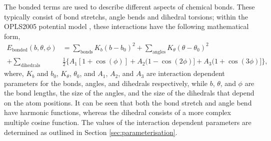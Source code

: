 The bonded terms are used to describe different aspects of chemical bonds.
These typically consist of bond stretchs, angle bends and dihedral torsions; within the OPLS2005 potential model \cite{Banks2005}, these interactions have the following mathematical form,
%
\begin{equation}
\begin{aligned}
  E_{\text{bonded}}(b, \theta, \phi) & = \sum_{\text{bonds}}K_b(b-b_0)^2 + \sum_{\text{angles}}K_{\theta}(\theta-\theta_0)^2 \\
  + \sum_{\text{dihedrals}} & \frac{1}{2}\big\{A_1[1 + \cos(\phi)] + A_2(1 - \cos(2\phi)] + A_3(1 + \cos(3\phi)]\big\},
\end{aligned}
\end{equation}
%
where, $K_b$ and $b_0$, $K_{\theta}$, $\theta_0$, and $A_1$, $A_2$, and $A_3$ are interaction dependent parameters for the bonds, angles, and dihedrals respectively, while $b$, $\theta$, and $\phi$ are the bond lengths, the size of the angles, and the size of the dihedrals that depend on the atom positions.
It can be seen that both the bond stretch and angle bend have harmonic functions, whereas the dihedral consists of a more complex multiple cosine function.
The values of the interaction dependent parameters are determined as outlined in Section \ref{sec:parameterisation}.

